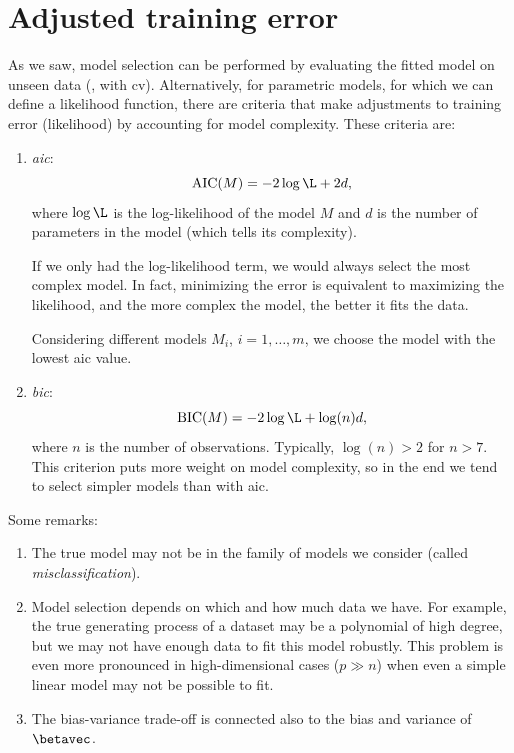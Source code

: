 \section{Adjusted training error}

As we saw, model selection can be performed by evaluating the fitted model on unseen data (\eg, with \acs{cv}). Alternatively, for parametric models, for which we can define a likelihood function, there are criteria that make adjustments to training error (likelihood) by accounting for model complexity. These criteria are:
\begin{enumerate}
    \item \emph{\acf{aic}}:
          \begin{equation}
              \operatorname{AIC}(M) = -2\log\L + 2d,
          \end{equation}
          where $\log\L$ is the log-likelihood of the model $M$ and $d$ is the number of parameters in the model (which tells its complexity).

          \begin{observation}
              If we only had the log-likelihood term, we would always select the most complex model. In fact, minimizing the error is equivalent to maximizing the likelihood, and the more complex the model, the better it fits the data.
          \end{observation}

          Considering different models $M_i$, $i = 1, \dots, m$, we choose the model with the lowest \acs{aic} value.

    \item \emph{\acf{bic}}:
          \begin{equation}
              \operatorname{BIC}(M) = -2\log\L + \log(n)d,
          \end{equation}
          where $n$ is the number of observations. Typically, $\log(n) > 2$ for $n > 7$. This criterion puts more weight on model complexity, so in the end we tend to select simpler models than with \acs{aic}.
\end{enumerate}

Some remarks:
\begin{enumerate}[beginpenalty=10000]
    \item The true model may not be in the family of models we consider (called \emph{misclassification}).
    \item Model selection depends on which and how much data we have. For example, the true generating process of a dataset may be a polynomial of high degree, but we may not have enough data to fit this model robustly. This problem is even more pronounced in high-dimensional cases ($p \gg n$) when even a simple linear model may not be possible to fit.
    \item The bias-variance trade-off is connected also to the bias and variance of $\betavec$.
\end{enumerate}

